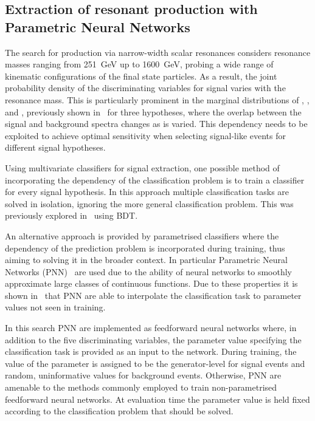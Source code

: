 \subsection{Extraction of resonant \HH production with Parametric
  Neural Networks}
\label{sec:mva_pnn}

The search for \HH production via narrow-width scalar resonances
considers resonance masses ranging from \SI{251}{\GeV} up to
\SI{1600}{\GeV}, probing a wide range of kinematic configurations of
the final state particles. As a result, the joint probability density
of the discriminating variables for signal varies with the resonance
mass. This is particularly prominent in the marginal distributions of
\mHH, \dRtautau, and \dRbb, previously shown in~
for three \mX hypotheses, where the overlap between the signal and
background spectra changes as \mX is varied. This dependency needs to
be exploited to achieve optimal sensitivity when selecting signal-like
events for different signal hypotheses.

Using multivariate classifiers for signal extraction, one possible
method of incorporating the \mX dependency of the classification
problem is to train a classifier for every signal hypothesis. In this
approach multiple classification tasks are solved in isolation,
ignoring the more general classification problem. This was previously
explored in~\cite{HIGG-2016-16-witherratum} using BDT.

An alternative approach is provided by parametrised classifiers where
the dependency of the prediction problem is incorporated during
training, thus aiming to solving it in the broader context. In
particular Parametric Neural Networks (PNN)~\cite{Baldi:2016fzo} are
used due to the ability of neural networks to smoothly approximate
large classes of continuous functions. Due to these properties it is
shown in~\cite{Baldi:2016fzo} that PNN are able to interpolate the
classification task to parameter values not seen in training.

In this search PNN are implemented as feedforward neural networks
where, in addition to the five discriminating variables, the parameter
value specifying the classification task is provided as an input to
the network. During training, the value of the parameter is assigned
to be the generator-level \mX for signal events and random,
uninformative values for background events. Otherwise, PNN are
amenable to the methods commonly employed to train non-parametrised
feedforward neural networks. At evaluation time the parameter value is
held fixed according to the classification problem that should be
solved.


